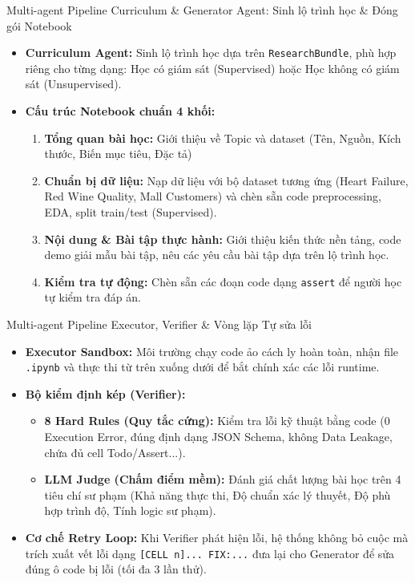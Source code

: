 \documentclass[aspectratio=169, 10pt, t]{beamer}
\begin{document}
\begin{frame}[fragile]{Multi-agent Pipeline}
  Curriculum \& Generator Agent: Sinh lộ trình học \& Đóng gói Notebook
  \begin{itemize}
    \item \textbf{Curriculum Agent:} Sinh lộ trình học dựa trên \texttt{ResearchBundle}, phù hợp riêng cho từng dạng: Học có giám sát (Supervised) hoặc Học không có giám sát (Unsupervised).
    \item \textbf{Cấu trúc Notebook chuẩn 4 khối:}
      \begin{enumerate}
        \item \textbf{Tổng quan bài học:} Giới thiệu về Topic và dataset (Tên, Nguồn, Kích thước, Biến mục tiêu, Đặc tả)
        \item \textbf{Chuẩn bị dữ liệu:} Nạp dữ liệu với bộ dataset tương ứng (Heart Failure, Red Wine Quality, Mall Customers) và chèn sẵn code preprocessing, EDA, split train/test (Supervised).
        \item \textbf{Nội dung \& Bài tập thực hành:} Giới thiệu kiến thức nền tảng, code demo giải mẫu bài tập, nêu các yêu cầu bài tập dựa trên lộ trình học.
        \item \textbf{Kiểm tra tự động:} Chèn sẵn các đoạn code dạng \texttt{assert} để người học tự kiểm tra đáp án.
      \end{enumerate}
  \end{itemize}
\end{frame}

\begin{frame}[fragile]{Multi-agent Pipeline}
  Executor, Verifier \& Vòng lặp Tự sửa lỗi
  \begin{itemize}
    \item \textbf{Executor Sandbox:} Môi trường chạy code ảo cách ly hoàn toàn, nhận file \texttt{.ipynb} và thực thi từ trên xuống dưới để bắt chính xác các lỗi runtime.
    \item \textbf{Bộ kiểm định kép (Verifier):}
      \begin{itemize}
        \item \textbf{8 Hard Rules (Quy tắc cứng):} Kiểm tra lỗi kỹ thuật bằng code (0 Execution Error, đúng định dạng JSON Schema, không Data Leakage, chứa đủ cell Todo/Assert...).
        \item \textbf{LLM Judge (Chấm điểm mềm):} Đánh giá chất lượng bài học trên 4 tiêu chí sư phạm (Khả năng thực thi, Độ chuẩn xác lý thuyết, Độ phù hợp trình độ, Tính logic sư phạm).
      \end{itemize}
    \item \textbf{Cơ chế Retry Loop:} Khi Verifier phát hiện lỗi, hệ thống không bỏ cuộc mà trích xuất vết lỗi dạng \texttt{[CELL n]... FIX:...} đưa lại cho Generator để sửa đúng ô code bị lỗi (tối đa 3 lần thử).
  \end{itemize}
\end{frame}
\end{document}
